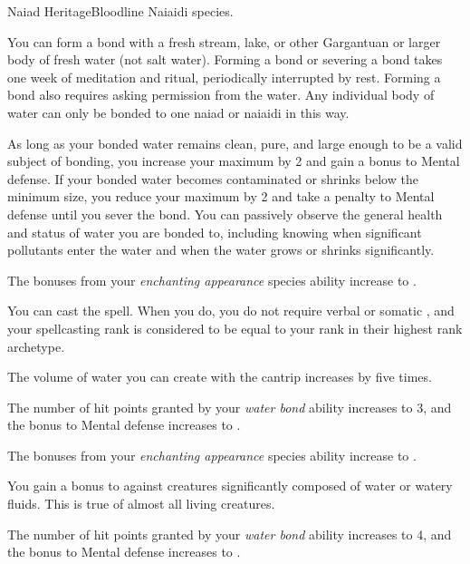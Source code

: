     \begin{feat}{Naiad Heritage}{Bloodline}
        \featpre Naiaidi species.

         You can form a bond with a fresh stream, lake, or other Gargantuan or larger body of fresh water (not salt water).
        Forming a bond or severing a bond takes one week of meditation and ritual, periodically interrupted by rest.
        Forming a bond also requires asking permission from the water.
        Any individual body of water can only be bonded to one naiad or naiaidi in this way.

        As long as your bonded water remains clean, pure, and large enough to be a valid subject of bonding, you increase your maximum  by 2 and gain a  bonus to Mental defense.
        If your bonded water becomes contaminated or shrinks below the minimum size, you reduce your maximum  by 2 and take a  penalty to Mental defense until you sever the bond.
        You can passively observe the general health and status of water you are bonded to, including knowing when significant pollutants enter the water and when the water grows or shrinks significantly.

         The bonuses from your \textit{enchanting appearance} species ability increase to .

         You can cast the  spell.
        When you do, you do not require verbal or somatic , and your spellcasting rank is considered to be equal to your rank in their highest rank archetype.

         The volume of water you can create with the  cantrip increases by five times.

         The number of hit points granted by your \textit{water bond} ability increases to 3, and the bonus to Mental defense increases to .

         The bonuses from your \textit{enchanting appearance} species ability increase to .

         You gain a  bonus to  against creatures significantly composed of water or watery fluids.
        This is true of almost all living creatures.

         The number of hit points granted by your \textit{water bond} ability increases to 4, and the bonus to Mental defense increases to .
    \end{feat}
